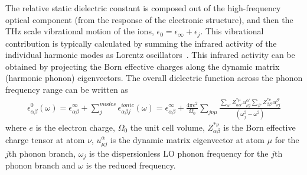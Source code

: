 The relative static dielectric constant is composed out of the high-frequency optical component (from the response of the electronic structure), and then the THz scale vibrational motion of the ions, $\epsilon_{0}=\epsilon_{\infty}+\epsilon_{j}$. This vibrational contribution is typically calculated by summing the infrared activity of the individual harmonic modes as Lorentz oscillators~\cite{gonze_dynamical_1997}. This infrared activity can be obtained by projecting the Born effective charges along the dynamic matrix (harmonic phonon) eigenvectors. The overall dielectric function across the phonon frequency range can be written as 
\begin{equation}
    \begin{gathered}
    \epsilon^0_{\alpha \beta}(\omega) = \epsilon^{\infty}_{\alpha \beta} + \sum_{j}^{modes} \epsilon^{ionic}_{\alpha \beta j}(\omega)
    = \epsilon^{\infty}_{\alpha \beta} + \frac{4\pi e^2}{\Omega_0} \sum_{j \nu\mu}\frac{ \sum_{\alpha'}Z^{*\mu}_{\alpha\alpha'} u_{\mu j}^{\alpha'}  \sum_{\beta'}Z^{*\nu}_{\beta\beta'}  u_{\nu j}^{\beta'}}{\left(\omega_{j}^2 - \omega^2   \right)}
    \end{gathered}
\end{equation}
where $e$ is the electron charge, $\Omega_0$ the unit cell volume, $Z^{*\nu}_{\alpha \beta}$ is the Born effective charge tensor at atom $\nu$, $u^\alpha_{\mu j}$ is the dynamic matrix eigenvector at atom $\mu$ for the $j$th phonon branch, $\omega_{j}$ is the dispersionless LO phonon frequency for the $j$th phonon branch and $\omega$ is the reduced frequency. 

